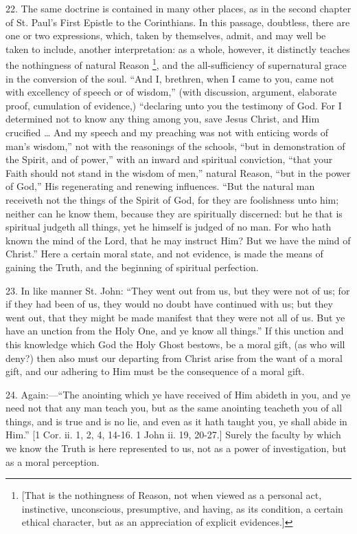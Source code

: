22. The same doctrine is contained in many other places, as in the
second chapter of St. Paul's First Epistle to the Corinthians. In this
passage, doubtless, there are one or two expressions, which, taken by
themselves, admit, and may well be taken to include, another
interpretation: as a whole, however, it distinctly teaches the
nothingness of natural Reason \footnote{[That is the
nothingness of Reason, not when viewed as a personal act, instinctive,
unconscious, presumptive, and having, as its condition, a certain
ethical character, but as an appreciation of explicit evidences.]},
and the all-sufficiency of supernatural grace in the conversion of the
soul. ``And I, brethren, when I came to you, came not with
excellency of speech or of wisdom,'' (with discussion, argument,
elaborate proof, cumulation of evidence,) ``declaring unto you the
testimony of God. For I determined not to know any thing among you,
save Jesus Christ, and Him crucified … And my speech and my
preaching was not with enticing words of man's wisdom,'' not with
the reasonings of the schools, ``but in demonstration of the
Spirit, and of power,'' with an inward and spiritual conviction,
``that your Faith should not stand in the wisdom of men,''
natural Reason, ``but in the power of God,'' His regenerating
and renewing influences. ``But the natural man receiveth not the
things of the Spirit of God, for they are foolishness unto him;
neither can he know them, because they are spiritually discerned: but
he that is spiritual judgeth all things, yet he himself is judged of
no man. For who hath known the mind of the Lord, that he may instruct
Him? But we have the mind of Christ.'' Here a certain moral state,
and not evidence, is made the means of gaining the Truth, and the
beginning of spiritual perfection.

23. In like manner St. John: ``They went out from us, but they
were not of us; for if they had been of us, they would no doubt have
continued with us; but they went out, that they might be made manifest
that they were not all of us. But ye have an unction from the Holy
One, and ye know all things.'' If this unction and this knowledge
which God the Holy Ghost bestows, be a moral gift, (as who will deny?)
then also must our departing from Christ arise from the want of a
moral gift, and our adhering to Him must be the consequence of a moral
gift.

24. Again:—``The anointing which ye have received of Him
abideth in you, and ye need not that any man teach you, but as the
same anointing teacheth you of all things, and is true and is no lie,
and even as it hath taught you, ye shall abide in Him.'' [1 Cor.
ii. 1, 2, 4, 14-16. 1 John ii. 19, 20-27.] Surely the faculty by which
we know the Truth is here represented to us, not as a power of
investigation, but as a moral perception.

